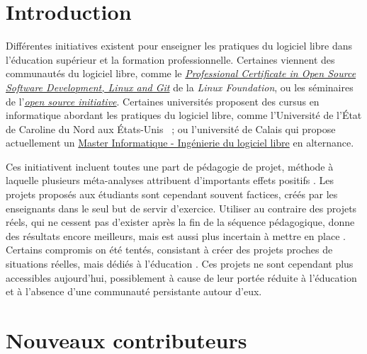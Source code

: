 \documentclass[dvipsnames,runningheads]{llncs}
\newcommand{\en}[1]{\foreignlanguage{english}{\emph{#1}}}
\begin{document}

    \section{Introduction}

    Différentes initiatives existent pour enseigner les pratiques du logiciel libre dans l'éducation supérieur
    et la formation professionnelle. Certaines viennent des communautés du logiciel libre, comme le
    \href{https://www.edx.org/professional-certificate/linuxfoundationx-open-source-software-development-linux-and-git}{\en{Professional
    Certificate in Open Source Software Development, Linux and Git}} de la \en{Linux Foundation}, ou les
    séminaires de l'\href{https://opensource.org/osi-open-source-education}{\en{open source initiative}}.
    Certaines universités proposent des cursus en informatique abordant les pratiques du logiciel libre, comme
    l'Université de l'État de Caroline du Nord aux États-Unis \parencite{oss-edu-2008} ; ou l'université de
    Calais qui propose actuellement un
    \href{https://www.univ-littoral.fr/formation/offre-de-formation/masters/master-informatique-ingenierie-du-logiciel-libre/}{Master
    Informatique - Ingénierie du logiciel libre} en alternance.

    Ces initiativent incluent toutes une part de pédagogie de projet, méthode à laquelle plusieurs
    méta-analyses attribuent d'importants effets positifs \cite{pbl-2019, pbl-2018}. Les projets proposés aux
    étudiants sont cependant souvent factices, créés par les enseignants dans le seul but de servir
    d'exercice. Utiliser au contraire des projets réels, qui ne cessent pas d'exister après la fin de la
    séquence pédagogique, donne des résultats encore meilleurs, mais est aussi plus incertain à mettre en
    place \cite{real-pbl-2010, real-pbl-2004}. Certains compromis on été tentés, consistant à créer des
    projets proches de situations réelles, mais dédiés à l'éducation \cite{oss-edu-2008}. Ces projets ne sont
    cependant plus accessibles aujourd'hui, possiblement à cause de leur portée réduite à l'éducation et à
    l'absence d'une communauté persistante autour d'eux.

    \section{Nouveaux contributeurs}
\end{document}
